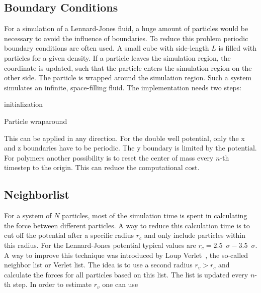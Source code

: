 \documentclass[a4paper]{article}
\begin{document}
\subsection{Boundary Conditions}

For a simulation of a Lennard-Jones fluid, a huge amount of particles would be necessary to avoid the influence of boundaries. To reduce this problem periodic boundary conditions are often used. A small cube with side-length $L$ is filled with particles for a given density. If a particle leaves the simulation region, the coordinate is updated, such that the particle enters the simulation region on the other side. The particle is wrapped around the simulation region. Such a system simulates an infinite, space-filling fluid. The implementation needs two steps:

\vspace{12pt}

\begin{algorithm}[H]
 initialization\;
 \caption{Particle wraparound}
 \label{alg:wraparound}
\end{algorithm}

\vspace{12pt}

This can be applied in any direction. For the double well potential, only the x and z boundaries have to be periodic. The y boundary is limited by the potential. For polymers another possibility is to reset the center of mass every $n$-th timestep to the origin. This can reduce the computational cost.

\subsection{Neighborlist}

For a system of $N$ particles, most of the simulation time is spent in calculating the force between different particles. A way to reduce this calculation time is to cut off the potential after a specific radius $r_c$ and only include particles within this radius. For the Lennard-Jones potential typical values are $r_c = 2.5 \enspace \sigma - 3.5\enspace \sigma$. A way to improve this technique was introduced by Loup Verlet~\cite{Verlet1967}, the so-called neighbor list or Verlet list. The idea is to use a second radius $r_v > r_c$  and calculate the forces for all particles based on this list. The list is updated every $n$-th step. In order to estimate $r_v$ one can use
\end{document}
